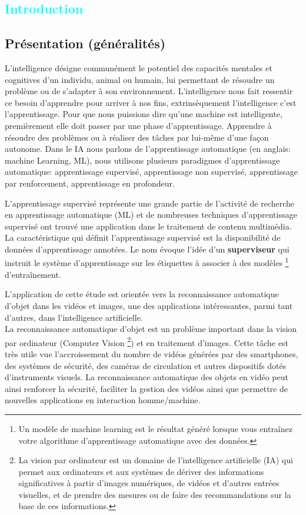 

\textcolor{cyan}{\chapter{Introduction}}
	\section{Présentation (généralités)}
	
		L’intelligence désigne communément le potentiel des capacités mentales et cognitives d'un individu, animal ou humain, lui permettant de résoudre un problème ou de s'adapter à son environnement. L'intelligence nous fait ressentir ce besoin d’apprendre pour arriver à nos fins, extrinsèquement l'intelligence c’est l'apprentissage. Pour que nous puissions dire qu’une machine est intelligente, premièrement elle doit passer par une phase d'apprentissage.  Apprendre à résoudre des problèmes ou à réaliser des tâches par lui-même d’une façon autonome. Dans le IA nous parlons de l’apprentissage automatique (en anglais: machine Learning, ML), nous utilisons plusieurs paradigmes d’apprentissage automatique:  apprentissage supervisé, apprentissage non supervisé, apprentissage par renforcement, apprentissage en profondeur.
	
		L'apprentissage supervisé représente une grande partie de l'activité de recherche en apprentissage automatique (ML) et de nombreuses techniques d'apprentissage supervisé ont trouvé une application dans le traitement de contenu multimédia. La caractéristique qui définit l'apprentissage supervisé est la disponibilité de données d'apprentissage annotées\cite{cunningham2008supervised}. Le nom évoque l'idée d'un \textbf{superviseur} qui instruit le système d'apprentissage sur les étiquettes à associer à des modèles \footnote{Un modèle de machine learning est le résultat généré lorsque vous entraînez votre algorithme d'apprentissage automatique avec des données.} d'entraînement. 
		
		L’application de cette étude est orientée vers la reconnaissance automatique d'objet dans les vidéos et images, une des applications intéressantes, parmi tant d'autres, dans l'intelligence artificielle.\\
		La reconnaissance automatique d'objet est un problème important dans la vision par ordinateur (Computer Vision 
			\footnote{La vision par ordinateur est un domaine de l'intelligence artificielle (IA) qui permet aux ordinateurs et aux systèmes de dériver des informations significatives à partir d'images numériques, de vidéos et d'autres entrées visuelles, et de prendre des mesures ou de faire des recommandations sur la base de ces informations.}) 
		et en traitement d'images. Cette tâche est très utile vue l'accroissement du nombre de vidéos générées par des smartphones, des systèmes de sécurité, des caméras de circulation et autres dispositifs dotés d'instruments visuels. La reconnaissance automatique des objets en vidéo peut ainsi renforcer la sécurité, faciliter la gestion des vidéos ainsi que permettre de nouvelles applications en interaction homme/machine.	
			
